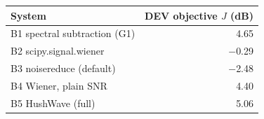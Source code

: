\begin{tabular}{lr}
\toprule
System & DEV objective $J$ (dB) \\
\midrule
B1 spectral subtraction (G1) & 4.65 \\
B2 scipy.signal.wiener & $-$0.29 \\
B3 noisereduce (default) & $-$2.48 \\
B4 Wiener, plain SNR & 4.40 \\
B5 HushWave (full) & 5.06 \\
\bottomrule
\end{tabular}

